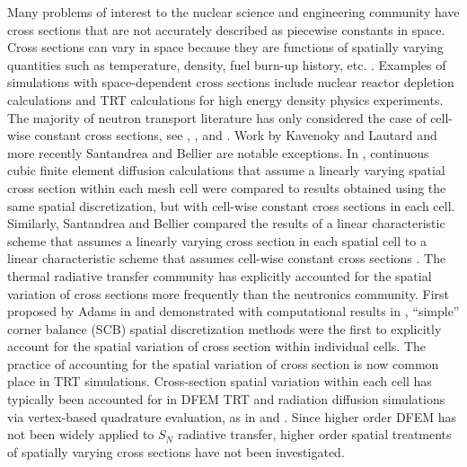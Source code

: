\documentclass[final,3p,times]{elsarticle}
\begin{document}
Many problems of interest to the nuclear science and engineering community have cross sections that are not accurately described as piecewise constants in space.
Cross sections can vary in space because they are functions of spatially varying quantities such as temperature, density, fuel burn-up history, etc. \cite{xs_are_T_dependent}.
Examples of simulations with space-dependent cross sections include nuclear reactor depletion calculations and TRT calculations for high energy density physics experiments.
The majority of neutron transport literature has only considered the case of cell-wise constant cross sections, see \cite{adams}, \cite{lewis_book},  and \cite{warsa_krylov}. 
Work by Kavenoky and Lautard \cite{varXS_diff} and more recently Santandrea and Bellier \cite{varXS_MOC} are notable exceptions.
In \cite{varXS_diff}, continuous cubic finite element diffusion calculations that assume a linearly varying spatial cross section within each mesh cell were compared to results obtained using the same spatial discretization, but with cell-wise constant cross sections in each cell.
Similarly, Santandrea and Bellier compared the results of a linear characteristic scheme that assumes a linearly varying cross section in each spatial cell 
to a linear characteristic scheme that assumes cell-wise constant cross sections \cite{varXS_MOC}.
The thermal radiative transfer community has explicitly accounted for the spatial variation of cross sections more frequently than the neutronics community.
First proposed by Adams in \cite{adams_scb} and demonstrated with computational results in \cite{adams_nowak}, ``simple'' corner balance (SCB) spatial discretization methods were the first to explicitly account for the spatial variation of cross section within individual cells.
The practice of accounting for the spatial variation of cross section is now common place in TRT simulations.
Cross-section spatial variation within each cell has typically been accounted for in DFEM TRT and radiation diffusion simulations via vertex-based quadrature evaluation, as in \cite{ober_shadid} and \cite{warsa_lmfga}.
Since higher order DFEM has not been widely applied to $S_N$ radiative transfer, higher order spatial treatments of spatially varying cross sections have not been investigated.
\end{document}
